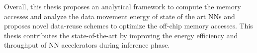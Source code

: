 Overall, this thesis proposes an analytical framework to compute the memory accesses and analyze the data movement energy of state of the art NNs and proposes novel data-reuse schemes to optimize the off-chip memory accesses. This thesis contributes the state-of-the-art by improving the energy efficiency and throughput of NN accelerators during inference phase.